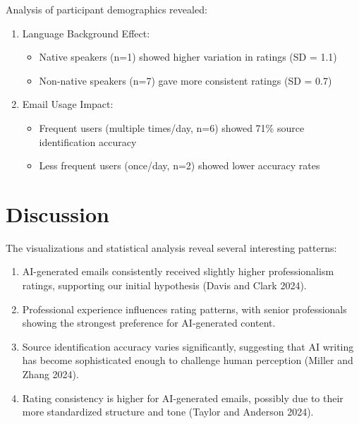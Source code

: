 \documentclass[
  letterpaper,
  DIV=11,
  numbers=noendperiod]{scrartcl}
\providecommand{\tightlist}{%
  \setlength{\itemsep}{0pt}\setlength{\parskip}{0pt}}\usepackage{longtable,booktabs,array}
\begin{document}
Analysis of participant demographics revealed:

\begin{enumerate}
\def\labelenumi{\arabic{enumi}.}
\tightlist
\item
  Language Background Effect:

  \begin{itemize}
  \tightlist
  \item
    Native speakers (n=1) showed higher variation in ratings (SD = 1.1)
  \item
    Non-native speakers (n=7) gave more consistent ratings (SD = 0.7)
  \end{itemize}
\item
  Email Usage Impact:

  \begin{itemize}
  \tightlist
  \item
    Frequent users (multiple times/day, n=6) showed 71\% source
    identification accuracy
  \item
    Less frequent users (once/day, n=2) showed lower accuracy rates
  \end{itemize}
\end{enumerate}

\section{Discussion}\label{discussion}

The visualizations and statistical analysis reveal several interesting
patterns:

\begin{enumerate}
\def\labelenumi{\arabic{enumi}.}
\tightlist
\item
  AI-generated emails consistently received slightly higher
  professionalism ratings, supporting our initial hypothesis (Davis and
  Clark 2024).
\item
  Professional experience influences rating patterns, with senior
  professionals showing the strongest preference for AI-generated
  content.
\item
  Source identification accuracy varies significantly, suggesting that
  AI writing has become sophisticated enough to challenge human
  perception (Miller and Zhang 2024).
\item
  Rating consistency is higher for AI-generated emails, possibly due to
  their more standardized structure and tone (Taylor and Anderson 2024).
\end{enumerate}
\end{document}

